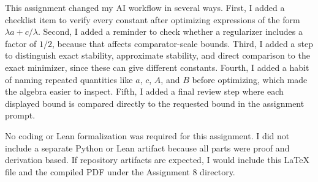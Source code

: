 \documentclass[11pt]{article}
\begin{document}
\begin{solutionbox}
This assignment changed my AI workflow in several ways. First, I added a checklist item to verify every constant after optimizing expressions of the form $\lambda a+c/\lambda$. Second, I added a reminder to check whether a regularizer includes a factor of $1/2$, because that affects comparator-scale bounds. Third, I added a step to distinguish exact stability, approximate stability, and direct comparison to the exact minimizer, since these can give different constants. Fourth, I added a habit of naming repeated quantities like $a$, $c$, $A$, and $B$ before optimizing, which made the algebra easier to inspect. Fifth, I added a final review step where each displayed bound is compared directly to the requested bound in the assignment prompt.

No coding or Lean formalization was required for this assignment. I did not include a separate Python or Lean artifact because all parts were proof and derivation based. If repository artifacts are expected, I would include this LaTeX file and the compiled PDF under the Assignment 8 directory.
\end{solutionbox}
\end{document}
